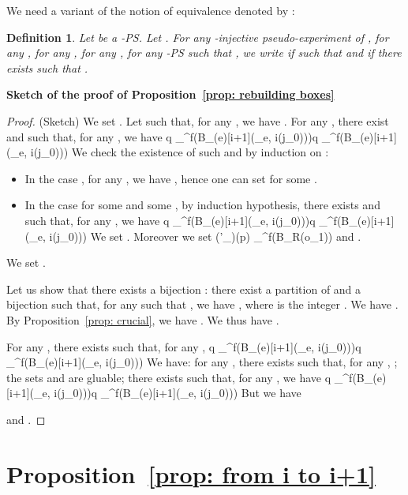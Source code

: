 \documentclass{article}
\theoremstyle{plain}
\newtheorem{definition}{Definition}
\newcommand{\taylor}[2]{\mathcal{T}(#1)[#2]}
\newcommand{\groundof}[1]{\mathcal{G}(#1)}
\newcommand{\cod}{\oc}
\newcommand{\conclusionscirc}[1]{\mathcal{P}_\circ^{\textsf{f}}(#1)}
\newcommand{\conclusionsnotcirc}[1]{\mathcal{P}_\bullet^{\textsf{f}}(#1)}
\begin{document}
We need a variant of the notion of equivalence denoted by :

\begin{definition}
Let  be a -PS. Let . For any -injective pseudo-experiment  of , for any , for any , for any , for any -PS  such that , we write  if  such that 
 and  if there exists  such that .
\end{definition}


\textbf{Sketch of the proof of Proposition~\ref{prop: rebuilding boxes}}


\begin{proof}(Sketch) 
We set . Let  such that, for any , we have . 
For any , there exist  and  such that, for any , we have   q \in \conclusionscirc{B_{\taylor{e}{i+1}}(\cod_{e, i}(j_0))}q \in \conclusionsnotcirc{B_{\taylor{e}{i+1}}(\cod_{e, i}(j_0))} We check the existence of such  and  by induction on :
\begin{itemize}
\item In the case , for any , we have , hence one can set  for some .
\item In the case  for some  and some , by induction hypothesis, there exists  and  such that, for any , we have   q \in \conclusionscirc{B_{\taylor{e}{i+1}}(\cod_{e, i}(j_0))}q \in \conclusionsnotcirc{B_{\taylor{e}{i+1}}(\cod_{e, i}(j_0))} We set . Moreover we set 
\groundof{\varphi'_{}}(p) \in \conclusionscirc{B_R(o_1)} and .
\end{itemize}

We set .

Let us show that there exists a bijection : 
there exist a partition  of  and a bijection  such that, for any  such that , we have , where  is the integer . We have . By Proposition~\ref{prop: crucial}, we have . We thus have .

For any , there exists  such that, for any ,  q \in \conclusionscirc{B_{\taylor{e}{i+1}}(\cod_{e, i}(j_0))}q \in \conclusionsnotcirc{B_{\taylor{e}{i+1}}(\cod_{e, i}(j_0))}
We have: for any , there exists  such that, for any , ; 
the sets  and  are gluable; 
there exists  such that, 
for any , we have  q \in \conclusionscirc{B_{\taylor{e}{i+1}}(\cod_{e, i}(j_0))}q \in \conclusionsnotcirc{B_{\taylor{e}{i+1}}(\cod_{e, i}(j_0))}
But we have 

and .
\end{proof}

\section{Proposition~\ref{prop: from i to i+1}}
\end{document}
